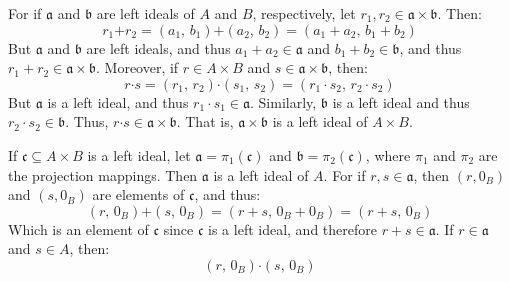 \documentclass[crop=false,class=article]{standalone}                           %
\begin{document}
        \begin{solution}
            For if $\mathfrak{a}$ and $\mathfrak{b}$ are left ideals of
            $A$ and $B$, respectively, let
            $r_{1},r_{2}\in\mathfrak{a}\times\mathfrak{b}$. Then:
            \begin{equation}
                r_{1}\boldsymbol{+}r_{2}
                =(a_{1},\,b_{1})\boldsymbol{+}(a_{2},\,b_{2})
                =(a_{1}+a_{2},\,b_{1}+b_{2})
            \end{equation}
            But $\mathfrak{a}$ and $\mathfrak{b}$ are left ideals, and
            thus $a_{1}+a_{2}\in\mathfrak{a}$ and
            $b_{1}+b_{2}\in\mathfrak{b}$, and thus
            $r_{1}+r_{2}\in\mathfrak{a}\times\mathfrak{b}$. Moreover, if
            $r\in{A}\times{B}$ and $s\in\mathfrak{a}\times\mathfrak{b}$,
            then:
            \begin{equation}
                r\boldsymbol{\cdot}{s}
                =(r_{1},\,r_{2})\boldsymbol{\cdot}(s_{1},\,s_{2})
                =(r_{1}\cdot{s}_{2},\,r_{2}\cdot{s}_{2})
            \end{equation}
            But $\mathfrak{a}$ is a left ideal, and thus
            $r_{1}\cdot{s}_{1}\in\mathfrak{a}$. Similarly, $\mathfrak{b}$
            is a left ideal and thus $r_{2}\cdot{s}_{2}\in\mathfrak{b}$.
            Thus, $r\boldsymbol{\cdot}s\in\mathfrak{a}\times\mathfrak{b}$.
            That is, $\mathfrak{a}\times\mathfrak{b}$ is a left ideal of
            $A\times{B}$.
            \par\hfill\par
            If $\mathfrak{c}\subseteq{A}\times{B}$ is a left ideal,
            let $\mathfrak{a}=\pi_{1}(\mathfrak{c})$ and
            $\mathfrak{b}=\pi_{2}(\mathfrak{c})$, where $\pi_{1}$ and
            $\pi_{2}$ are the projection mappings. Then $\mathfrak{a}$ is
            a left ideal of $A$. For if $r,s\in\mathfrak{a}$, then
            $(r,0_{B})$ and $(s,0_{B})$ are elements of $\mathfrak{c}$,
            and thus:
            \begin{equation}
                (r,\,0_{B})\boldsymbol{+}(s,\,0_{B})
                =(r+s,\,0_{B}+0_{B})
                =(r+s,\,0_{B})
            \end{equation}
            Which is an element of $\mathfrak{c}$ since $\mathfrak{c}$ is
            a left ideal, and therefore $r+s\in\mathfrak{a}$. If
            $r\in\mathfrak{a}$ and $s\in{A}$, then:
            \begin{equation}
                (r,\,0_{B})\boldsymbol{\cdot}(s,\,0_{B})

\end{equation}
\end{solution}
\end{document}
